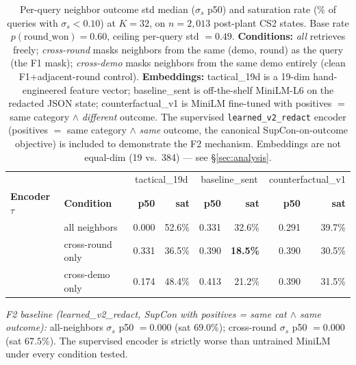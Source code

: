 \documentclass{article}
\begin{document}
\begin{table}[t]
\centering
\caption{Per-query neighbor outcome std median ($\sigma_s$ p50) and saturation rate (\% of queries with $\sigma_s < 0.10$) at $K{=}32$, on $n{=}2{,}013$ post-plant CS2 states. Base rate $p(\text{round\_won}) = 0.60$, ceiling per-query std $= 0.49$. \textbf{Conditions:} \textit{all} retrieves freely; \textit{cross-round} masks neighbors from the same (demo, round) as the query (the F1 mask); \textit{cross-demo} masks neighbors from the same demo entirely (clean F1+adjacent-round control). \textbf{Embeddings:} tactical\_19d is a 19-dim hand-engineered feature vector; baseline\_sent is off-the-shelf MiniLM-L6 on the redacted JSON state; counterfactual\_v1 is MiniLM fine-tuned with positives $=$ same category $\wedge$ \emph{different} outcome. The supervised \texttt{learned\_v2\_redact} encoder (positives $=$ same category $\wedge$ \emph{same} outcome, the canonical SupCon-on-outcome objective) is included to demonstrate the F2 mechanism. Embeddings are not equal-dim (19 vs.\ 384) — see \S\ref{sec:analysis}.}
\label{tab:variance}
\small
\begin{tabular}{ll rr rr rr}
\toprule
& & \multicolumn{2}{c}{tactical\_19d} & \multicolumn{2}{c}{baseline\_sent} & \multicolumn{2}{c}{counterfactual\_v1} \\
\cmidrule(lr){3-4}\cmidrule(lr){5-6}\cmidrule(lr){7-8}
\textbf{Encoder $\tau$} & \textbf{Condition} & \textbf{p50} & \textbf{sat} & \textbf{p50} & \textbf{sat} & \textbf{p50} & \textbf{sat} \\
\midrule
                & all neighbors      & 0.000 & 52.6\% & 0.331 & 32.6\% & 0.291 & 39.7\% \\
                & cross-round only   & 0.331 & 36.5\% & 0.390 & \textbf{18.5\%} & 0.390 & 30.5\% \\
                & cross-demo only    & 0.174 & 48.4\% & 0.413 & 21.2\% & 0.390 & 31.5\% \\
\bottomrule
\end{tabular}

\vspace{0.5em}
\small
\textit{F2 baseline (learned\_v2\_redact, SupCon with positives = same cat $\wedge$ same outcome):} all-neighbors $\sigma_s$ p50 $= 0.000$ (sat $69.0\%$); cross-round $\sigma_s$ p50 $= 0.000$ (sat $67.5\%$). The supervised encoder is strictly worse than untrained MiniLM under every condition tested.
\end{table}
\end{document}
